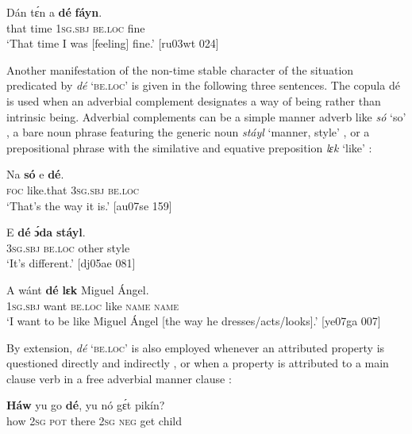 \ea%
    \label{ex:key:786}
    \gll Dán  tɛ́n  a    \textbf{dé}    \textbf{fáyn}.\\
that  time  \textsc{1sg.sbj}  \textsc{be.loc}  fine\\

\glt ‘That time I was [feeling] fine.’ [ru03wt 024]
\z

Another manifestation of the non-time stable character of the situation predicated by \textit{dé} ‘\textsc{be.loc}’ is given in the following three sentences. The copula dé is used when an adverbial complement designates a way of being rather than intrinsic being. Adverbial complements can be a simple manner adverb like \textit{só} ‘so’ , a bare noun phrase featuring the generic noun \textit{stáyl} ‘manner, style’ , or a prepositional phrase with the similative{\fff} and equative preposition \textit{lɛk} ‘like’ :


\ea%
    \label{ex:key:787}
    \gll Na  \textbf{só}    e    \textbf{dé}.\\
\textsc{foc}  like.that  \textsc{3sg.sbj}  \textsc{be.loc}\\

\glt ‘That’s the way it is.’ [au07se 159]
\z


\ea%
    \label{ex:key:788}
    \gll E    \textbf{dé}    \textbf{ɔ́da}    \textbf{stáyl}.\\
\textsc{3sg.sbj}  \textsc{be.loc}  other  style\\

\glt ‘It’s different.’ [dj05ae 081]
\z


\ea%
    \label{ex:key:789}
    \gll \MakeUppercase{A}   wánt  \textbf{dé}    \textbf{lɛk}  Miguel  Ángel.\\
\textsc{1sg.sbj}  want  \textsc{be.loc}  like  \textsc{name}  \textsc{name}\\

\glt ‘I want to be like Miguel Ángel [the way he dresses/acts/looks].’ [ye07ga 007]
\z

By extension, \textit{dé} ‘\textsc{be.loc}’ is also employed whenever an attributed property is questioned directly  and indirectly , or when a property is attributed to a main clause verb in a free adverbial manner clause :


\ea%
    \label{ex:key:790}
    \gll \textbf{Háw}    yu  go  \textbf{dé},    yu  nó  gɛ́t  pikín?\\
how    \textsc{2sg}  \textsc{pot}  there  \textsc{2sg}  \textsc{neg}  get  child\\

